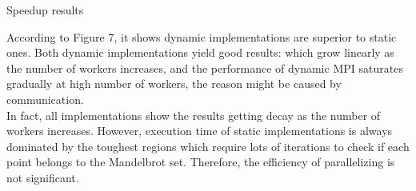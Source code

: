 \documentclass[12pt]{article}
\makeatletter
\renewenvironment{itemize}
{\list{$\bullet$}{\leftmargin\z@ \labelwidth\z@ \itemindent-\leftmargin
\let\makelabel\descriptionlabel}}
{\endlist}
\makeatother
\begin{document}
\begin{itemize}
    \item Speedup results
    \begin{flushleft}
        According to Figure 7, it shows dynamic implementations are superior to static ones. Both dynamic implementations yield good results: which grow linearly as the number of workers increases, and the performance of dynamic MPI saturates gradually at high number of workers, the reason might be caused by communication. \\
        In fact, all implementations show the results getting decay as the number of workers increases. However, execution time of static implementations is always dominated by the toughest regions which require lots of iterations to check if each point belongs to the Mandelbrot set. Therefore, the efficiency of parallelizing is not significant.
    \end{flushleft}

    \newpage


\end{itemize}
\end{document}
